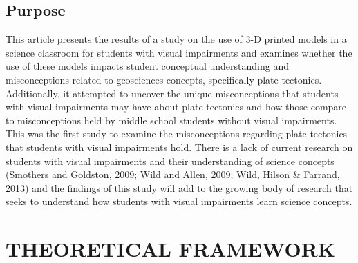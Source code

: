 \documentclass[11.5pt]{sig-alternate} %
\begin{document}
\begin{large}
\subsection*{Purpose}

This article presents the results of a study on the use of 3-D printed models in a science classroom for students with visual impairments and examines whether the use of these models impacts student conceptual understanding and misconceptions related to geosciences concepts, specifically plate tectonics.  Additionally, it attempted to uncover the unique misconceptions that students with visual impairments may have about plate tectonics and how those compare to misconceptions held by middle school students without visual impairments.  This was the first study to examine the misconceptions regarding plate tectonics that students with visual impairments hold.  There is a lack of current research on students with visual impairments and their understanding of science concepts (Smothers and Goldston, 2009; Wild and Allen, 2009; Wild, Hilson \& Farrand, 2013) and the findings of this study will add to the growing body of research that seeks to understand how students with visual impairments learn science concepts.  

\section*{THEORETICAL FRAMEWORK}


\end{large}
\end{document}
